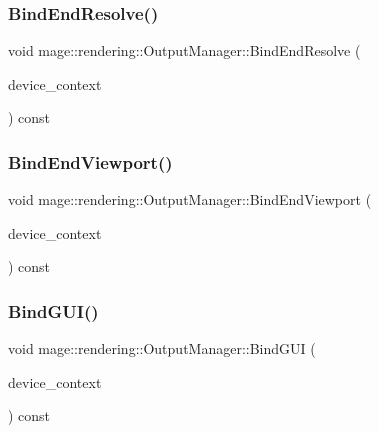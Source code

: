 \subsubsection{\texorpdfstring{Bind\+End\+Resolve()}{BindEndResolve()}}
{\footnotesize\ttfamily void mage\+::rendering\+::\+Output\+Manager\+::\+Bind\+End\+Resolve (\begin{DoxyParamCaption}\item[{I\+D3\+D11\+Device\+Context \&}]{device\+\_\+context }\end{DoxyParamCaption}) const\hspace{0.3cm}{\ttfamily [noexcept]}}

\hypertarget{classmage_1_1rendering_1_1_output_manager_a1b99009331167e4548dbb58695926542}{}\label{classmage_1_1rendering_1_1_output_manager_a1b99009331167e4548dbb58695926542} 
\subsubsection{\texorpdfstring{Bind\+End\+Viewport()}{BindEndViewport()}}
{\footnotesize\ttfamily void mage\+::rendering\+::\+Output\+Manager\+::\+Bind\+End\+Viewport (\begin{DoxyParamCaption}\item[{I\+D3\+D11\+Device\+Context \&}]{device\+\_\+context }\end{DoxyParamCaption}) const\hspace{0.3cm}{\ttfamily [noexcept]}}

\hypertarget{classmage_1_1rendering_1_1_output_manager_a08be9cc8922f891c8ea4f17559ee40db}{}\label{classmage_1_1rendering_1_1_output_manager_a08be9cc8922f891c8ea4f17559ee40db} 
\subsubsection{\texorpdfstring{Bind\+G\+U\+I()}{BindGUI()}}
{\footnotesize\ttfamily void mage\+::rendering\+::\+Output\+Manager\+::\+Bind\+G\+UI (\begin{DoxyParamCaption}\item[{I\+D3\+D11\+Device\+Context \&}]{device\+\_\+context }\end{DoxyParamCaption}) const\hspace{0.3cm}{\ttfamily [noexcept]}}

